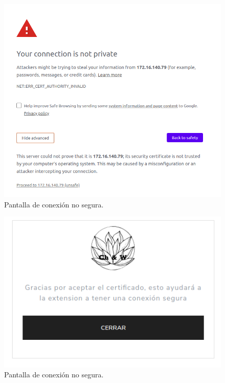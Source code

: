\documentclass[12pt, a4paper, titlepage]{report}
\begin{document}
        \begin{figure}[H]
    		\begin{center}	
    		\includegraphics[width=14cm]{./imagenes/Aviso/Ext_aviso.png}
    		\caption{Pantalla de conexión no segura.}
    		\label{fig:Ext_aviso}
    		\end{center}
    	\end{figure}
        
        \begin{figure}[H]
    		\begin{center}	
    		\includegraphics[width=12cm]{./imagenes/Aviso/Ext_avisoAccept.png}
    		\caption{Pantalla de conexión no segura.}
    		\label{fig:Ext_avisoNosegura}
    		\end{center}
    	\end{figure}
    	
\end{document}
